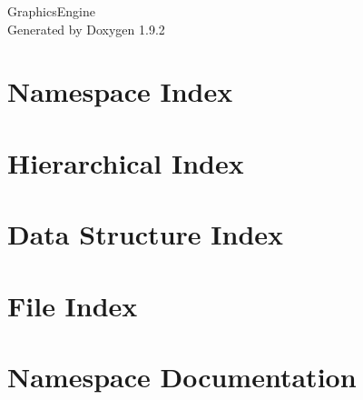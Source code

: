 \documentclass[twoside]{book}
\newcommand{\+}{\discretionary{\mbox{\scriptsize$\hookleftarrow$}}{}{}}
\newcommand{\clearemptydoublepage}{%
    \newpage{\pagestyle{empty}\cleardoublepage}%
  }
\begin{document}
  \raggedbottom
    \hypersetup{pageanchor=false,
                bookmarksnumbered=true,
                pdfencoding=unicode
               }
  \begin{titlepage}
  \vspace*{7cm}
  \begin{center}%
  {\Large Graphics\+Engine}\\
  \vspace*{1cm}
  {\large Generated by Doxygen 1.9.2}\\
  \end{center}
  \end{titlepage}
  \clearemptydoublepage
  \tableofcontents
  \clearemptydoublepage
  \hypersetup{pageanchor=true}
\chapter{Namespace Index}

\chapter{Hierarchical Index}

\chapter{Data Structure Index}

\chapter{File Index}

\chapter{Namespace Documentation}

\end{document}
